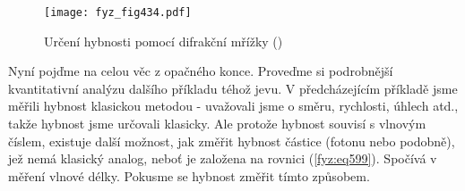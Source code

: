     \begin{figure}[ht!] %
      \centering
      \texttt{[image: fyz\_fig434.pdf]}
      \caption{Určení hybnosti pomocí difrakční mřížky (\cite[s.~513]{Feynman01})}
      \label{fyz:fig434}
    \end{figure}

    Nyní pojďme na celou věc z opačného konce. Proveďme si podrobnější kvantitativní analýzu dalšího
    příkladu téhož jevu. V předcházejícím příkladě jsme měřili hybnost klasickou metodou - uvažovali
    jsme o směru, rychlosti, úhlech atd., takže hybnost jsme určovali klasicky. Ale protože hybnost
    souvisí s vlnovým číslem, existuje další možnost, jak změřit hybnost částice (fotonu nebo
    podobně), jež nemá klasický analog, neboť je založena na rovnici (\ref{fyz:eq599}). Spočívá v
    měření vlnové délky. Pokusme se hybnost změřit tímto způsobem.
    
